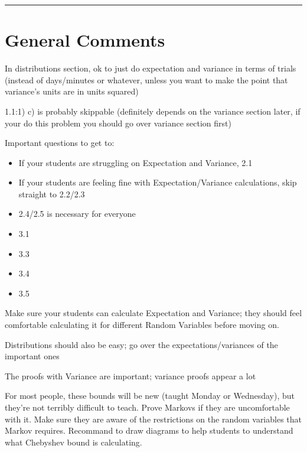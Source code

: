 \documentclass{exam}
\title{}
\date{Distributions, Variance, Inequalities, Confidence Intervals}
\begin{document}
\maketitle
\rule{\textwidth}{0.15em}
\fontsize{12}{15}\selectfont
\thispagestyle{empty}


\section{General Comments}
\begin{questions}
\item In distributions section, ok to just do expectation and variance in terms of trials (instead of days/minutes or whatever, unless you want to make the point that variance’s units are in units squared)
\item 1.1:1) c) is probably skippable (definitely depends on the variance section later, if your do this problem you should go over variance section first)
\item Important questions to get to:
\begin{itemize}
\item If your students are struggling on Expectation and Variance, 2.1
\item If your students are feeling fine with Expectation/Variance calculations, skip straight to 2.2/2.3
\item 2.4/2.5 is necessary for everyone
\item 3.1
\item 3.3
\item 3.4
\item 3.5
\end{itemize}

\item Make sure your students can calculate Expectation and Variance; they should feel comfortable calculating it for different Random Variables before moving on.
\item Distributions should also be easy; go over the expectations/variances of the important ones
\item The proofs with Variance are important; variance proofs appear a lot
\item For most people, these bounds will be new (taught Monday or Wednesday), but they’re not terribly difficult to teach. Prove Markovs if they are uncomfortable with it. Make sure they are aware of the restrictions on the random variables that Markov requires. Recommand to draw diagrams to help students to understand what Chebyshev bound is calculating.


\end{questions}
\end{document}
